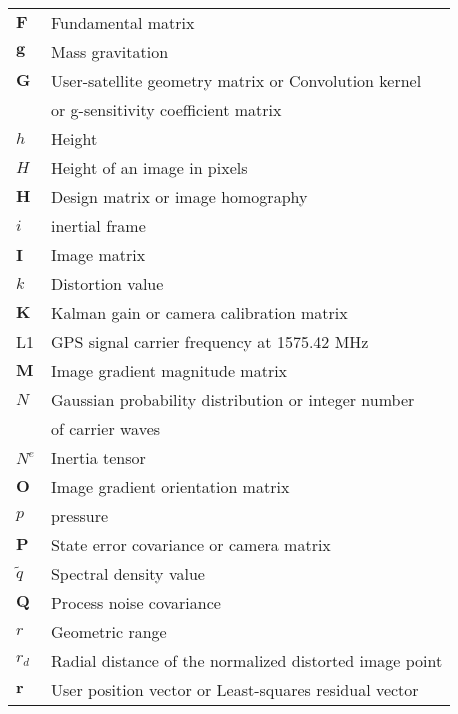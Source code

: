 \begin{tabular}{l@{\hspace{3cm}}l}
$\mathbf F$ & Fundamental matrix\\[0.5ex]
$\mathbf g$ & Mass gravitation\\[2.0ex]
$\mathbf G$ & User-satellite geometry matrix or Convolution kernel\\[0.5ex]
{} &  or g-sensitivity coefficient matrix\\[2.0ex]
$h$ & Height\\[2.0ex]
$H$ & Height of an image in pixels\\[2.0ex]
$\mathbf H$ & Design matrix or image homography\\[2.0ex]
$i$ & inertial frame\\[2.0ex]
$\mathbf I$ & Image matrix\\[2.0ex]
$k$ & Distortion value\\[2.0ex]
$\mathbf K$ & Kalman gain or camera calibration matrix\\[2.0ex]
L1 & GPS signal carrier frequency at 1575.42 MHz\\[2.0ex]
$\mathbf M$ & Image gradient magnitude matrix\\[2.0ex]
$N$ & Gaussian probability distribution or integer number\\[0.5ex]
{} & of carrier waves\\[2.0ex]
$N^e$ & Inertia tensor\\[2.0ex]
$\mathbf O$ & Image gradient orientation matrix\\[2.0ex]
$p$ & pressure\\[2.0ex]
$\mathbf P$ & State error covariance or camera matrix\\[2.0ex]
$\tilde q$ & Spectral density value\\[2.0ex]
$\mathbf Q$ & Process noise covariance\\[2.0ex]
$r$ & Geometric range\\[2.0ex]
$r_d$ & Radial distance of the normalized distorted image point\\[2.0ex]
$\mathbf r$ & User position vector or Least-squares residual vector\\[2.0ex]
\end{tabular}
\newpage
